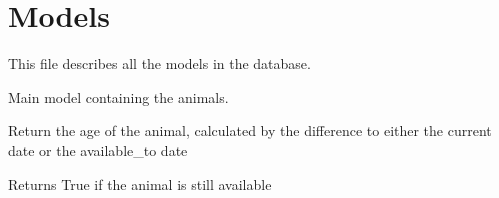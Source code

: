 \documentclass[letterpaper,10pt,openany,oneside,english]{sphinxmanual}
\begin{document}
\section{Models}
\label{\detokenize{index:module-animals.models}}\label{\detokenize{index:models}}
This file describes all the models in the database.

\begin{fulllineitems}
\label{\detokenize{index:animals.models.Animal}}
Main model containing the animals.

\begin{fulllineitems}
\label{\detokenize{index:animals.models.Animal.DoesNotExist}}
\end{fulllineitems}


\begin{fulllineitems}
\label{\detokenize{index:animals.models.Animal.MultipleObjectsReturned}}
\end{fulllineitems}


\begin{fulllineitems}
\label{\detokenize{index:animals.models.Animal.age}}
Return the age of the animal, calculated by the difference to either
the current date or the available\_to date

\end{fulllineitems}


\begin{fulllineitems}
\label{\detokenize{index:animals.models.Animal.available}}
Returns True if the animal is still available

\end{fulllineitems}


\end{fulllineitems}
\end{document}
